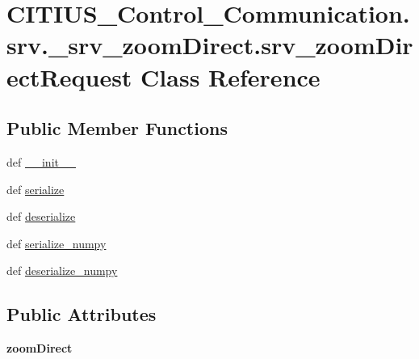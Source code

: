 \hypertarget{class_c_i_t_i_u_s___control___communication_1_1srv_1_1__srv__zoom_direct_1_1srv__zoom_direct_request}{\section{\-C\-I\-T\-I\-U\-S\-\_\-\-Control\-\_\-\-Communication.\-srv.\-\_\-srv\-\_\-zoom\-Direct.\-srv\-\_\-zoom\-Direct\-Request \-Class \-Reference}
\label{class_c_i_t_i_u_s___control___communication_1_1srv_1_1__srv__zoom_direct_1_1srv__zoom_direct_request}
}
\subsection*{\-Public \-Member \-Functions}
\begin{DoxyCompactItemize}
\item 
def \hyperlink{class_c_i_t_i_u_s___control___communication_1_1srv_1_1__srv__zoom_direct_1_1srv__zoom_direct_request_a4cad367f90b66103326cf78039390fb0}{\-\_\-\-\_\-init\-\_\-\-\_\-}
\item 
def \hyperlink{class_c_i_t_i_u_s___control___communication_1_1srv_1_1__srv__zoom_direct_1_1srv__zoom_direct_request_ab646bccc5822806f57979091895ecfc4}{serialize}
\item 
def \hyperlink{class_c_i_t_i_u_s___control___communication_1_1srv_1_1__srv__zoom_direct_1_1srv__zoom_direct_request_aa3cf0653d8f65bdfd25ddd283042667f}{deserialize}
\item 
def \hyperlink{class_c_i_t_i_u_s___control___communication_1_1srv_1_1__srv__zoom_direct_1_1srv__zoom_direct_request_a4935ef55066cdff6acd3d3eb4d91e50b}{serialize\-\_\-numpy}
\item 
def \hyperlink{class_c_i_t_i_u_s___control___communication_1_1srv_1_1__srv__zoom_direct_1_1srv__zoom_direct_request_a1a1b58f83fff0ebe7904ddd9c1dfc729}{deserialize\-\_\-numpy}
\end{DoxyCompactItemize}
\subsection*{\-Public \-Attributes}
\begin{DoxyCompactItemize}
\item 
\hypertarget{class_c_i_t_i_u_s___control___communication_1_1srv_1_1__srv__zoom_direct_1_1srv__zoom_direct_request_ac8565a55d59a8b94795a634dd63887a2}{{\bfseries zoom\-Direct}}\label{class_c_i_t_i_u_s___control___communication_1_1srv_1_1__srv__zoom_direct_1_1srv__zoom_direct_request_ac8565a55d59a8b94795a634dd63887a2}

\end{DoxyCompactItemize}
